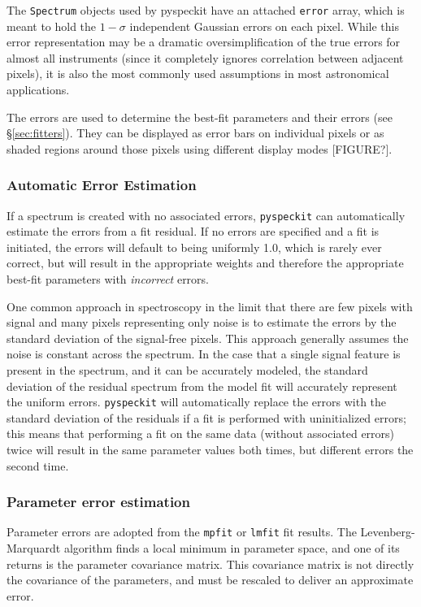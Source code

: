 \documentclass[twocolumn]{aastex61}
\newcommand{\pyspeckit}{\texttt{pyspeckit}\xspace}
\begin{document}


The \texttt{Spectrum} objects used by pyspeckit have an attached \texttt{error}
array, which is meant to hold the $1-\sigma$ independent Gaussian errors on
each pixel.  While this error representation may be a dramatic
oversimplification of the true errors for almost all instruments (since it
completely ignores correlation between adjacent pixels), it is also the most
commonly used assumptions in most astronomical applications.

The errors are used to determine the best-fit parameters and their errors (see
\S \ref{sec:fitters}).  They can be displayed as error bars on individual
pixels or as shaded regions around those pixels using different display modes
[FIGURE?].

\subsubsection{Automatic Error Estimation}
If a spectrum is created with no associated errors, \pyspeckit can automatically
estimate the errors from a fit residual.  If no errors are specified and
a fit is initiated, the errors will default to being uniformly 1.0, which
is rarely ever correct, but will result in the appropriate weights and
therefore the appropriate best-fit parameters with \emph{incorrect} errors.

One common approach in spectroscopy in the limit that there are few pixels with
signal and many pixels representing only noise is to estimate the errors by the
standard deviation of the signal-free pixels.  This approach generally assumes
the noise is constant across the spectrum.  In the case that a single signal
feature is present in the spectrum, and it can be accurately modeled, the
standard deviation of the residual spectrum from the model fit will accurately
represent the uniform errors.  \pyspeckit will automatically replace the errors
with the standard deviation of the residuals if a fit is performed with
uninitialized errors; this means that performing a fit on the same data
(without associated errors) twice will result in the same parameter values both
times, but different errors the second time.


\subsubsection{Parameter error estimation}
\label{sec:parerrest}
Parameter errors are adopted from the \texttt{mpfit} or \texttt{lmfit}
fit results.  The Levenberg-Marquardt algorithm
 finds a local minimum in parameter space,
and one of its returns is the parameter covariance matrix.  This covariance
matrix is not directly the covariance of the parameters, and must be rescaled
to deliver an approximate error.
\end{document}
